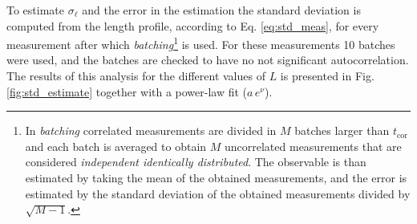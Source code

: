 To estimate $\sigma_\ell$ and the error in the estimation the standard deviation is computed from the length profile, according to Eq. \eqref{eq:std_meas}, for every measurement after which \emph{batching}\footnote{In \emph{batching} correlated measurements are divided in $M$ batches larger than $t_\text{cor}$ and each batch is averaged to obtain $M$ uncorrelated measurements that are considered \emph{independent identically distributed}.
The observable is than estimated by taking the mean of the obtained measurements, and the error is estimated by the standard deviation of the obtained measurements divided by $\sqrt{M - 1}.$
} is used. For these measurements 10 batches were used, and the batches are checked to have no not significant autocorrelation.
The results of this analysis for the different values of $L$ is presented in Fig. \ref{fig:std_estimate} together with a power-law fit ($a \, e^{\nu}$).
